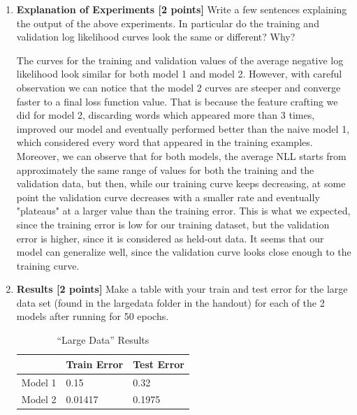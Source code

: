 \documentclass[11pt]{article}
\numberwithin{equation}{section} %
\numberwithin{figure}{section} %
\numberwithin{table}{section} %
\begin{document}
\begin{enumerate}
\item {\bf Explanation of Experiments [2 points]}
Write a few sentences explaining the output of the above experiments. In particular do the training and validation log likelihood curves look the same or different? Why?

\begin{solution}
    The curves for the training and validation values of the average negative log likelihood look similar for both model 1 and model 2. However, with careful observation we can notice that the model 2 curves are steeper and converge faster to a final loss function value. That is because the feature crafting we did for model 2, discarding words which appeared more than 3 times, improved our model and eventually performed better than the naive model 1, which considered every word that appeared in the training examples. Moreover, we can observe that for both models, the average NLL starts from approximately the same range of values for both the training and the validation data, but then, while our training curve keeps decreasing, at some point the validation curve decreases with a smaller rate and eventually "plateaus" at a larger value than the training error. This is what we expected, since the training error is low for our training dataset, but the validation error is higher, since it is considered as held-out data. It seems that our model can generalize well, since the validation curve looks close enough to the training curve.
\end{solution}

\item {\bf Results [2 points]} 
Make a table with your train and test error for the large data set (found in the largedata folder in the handout) for each of the 2 models after running for 50 epochs.

\begin{solution}
     \begin{table}[H]
        \centering
        \begin{tabular}{l|l|l}
        \toprule
        & Train Error & Test Error \\ 
        \midrule
        Model 1      &0.15         &0.32         \\ 
        Model 2 &0.01417         &0.1975         \\ 
        \bottomrule
        \end{tabular}
        \caption{``Large Data'' Results}
        \label{results}
    \end{table}
\end{solution}


        
\end{enumerate}
\end{document}
